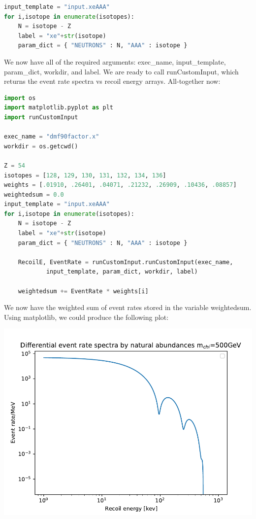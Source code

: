 \documentclass[12pt]{article}
\begin{document}
\begin{lstlisting}[language=python]
input_template = "input.xeAAA"
for i,isotope in enumerate(isotopes):
    N = isotope - Z
    label = "xe"+str(isotope)
    param_dict = { "NEUTRONS" : N, "AAA" : isotope }
\end{lstlisting}
We now have all of the required arguments: exec\_name, input\_template,
param\_dict, workdir, and label. We are ready to call runCustomInput, which
returns the event rate spectra vs recoil energy arrays. All-together now:
\begin{lstlisting}[language=python]
import os
import matplotlib.pyplot as plt
import runCustomInput

exec_name = "dmf90factor.x"
workdir = os.getcwd()

Z = 54
isotopes = [128, 129, 130, 131, 132, 134, 136]
weights = [.01910, .26401, .04071, .21232, .26909, .10436, .08857]
weightedsum = 0.0
input_template = "input.xeAAA"
for i,isotope in enumerate(isotopes):
    N = isotope - Z
    label = "xe"+str(isotope)
    param_dict = { "NEUTRONS" : N, "AAA" : isotope }

    RecoilE, EventRate = runCustomInput.runCustomInput(exec_name,
            input_template, param_dict, workdir, label)

    weightedsum += EventRate * weights[i]    
\end{lstlisting}
We now have the weighted sum of event rates stored in the variable weightedsum.
Using matplotlib, we could produce the following plot:

{
	\centering
\includegraphics[width=\textwidth]{weightedspectra.pdf}

}
\end{document}

